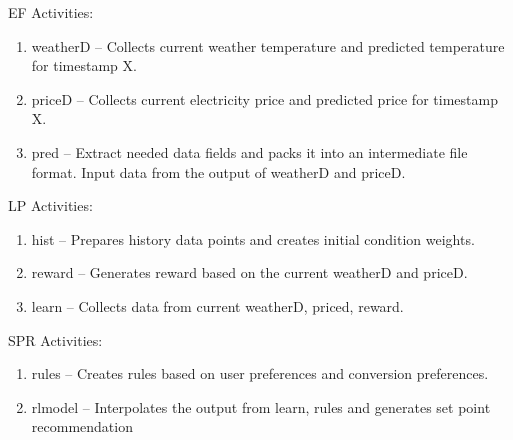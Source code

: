 EF Activities:

\begin{enumerate}
\item weatherD – Collects current weather temperature and predicted temperature for timestamp
X.
\item priceD – Collects current electricity price and predicted price for timestamp X.
\item pred – Extract needed data fields and packs it into an intermediate file format. Input data
from the output of weatherD and priceD.
\end{enumerate}


LP Activities:

\begin{enumerate}
\item hist – Prepares history data points and creates initial condition weights.
\item reward – Generates reward based on the current weatherD and priceD.
\item learn – Collects data from current weatherD, priced, reward.
\end{enumerate}

SPR Activities:

\begin{enumerate}
\item rules – Creates rules based on user preferences and conversion preferences.
\item rlmodel – Interpolates the output from learn, rules and generates set point recommendation
\end{enumerate}

